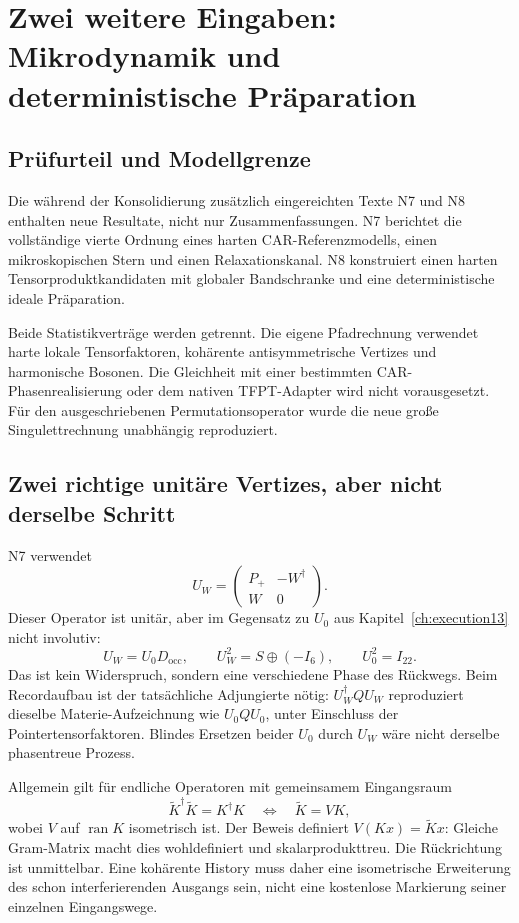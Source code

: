 \chapter{Zwei weitere Eingaben: Mikrodynamik und deterministische Präparation}
\label{ch:newinputs13}
\section{Prüfurteil und Modellgrenze}
Die während der Konsolidierung zusätzlich eingereichten Texte N7 und N8 enthalten neue Resultate, nicht nur Zusammenfassungen. N7 berichtet die vollständige vierte Ordnung eines harten CAR-Referenzmodells, einen mikroskopischen Stern und einen Relaxationskanal. N8 konstruiert einen harten Tensorproduktkandidaten mit globaler Bandschranke und eine deterministische ideale Präparation.

Beide Statistikverträge werden getrennt. Die eigene Pfadrechnung verwendet harte lokale Tensorfaktoren, kohärente antisymmetrische Vertizes und harmonische Bosonen. Die Gleichheit mit einer bestimmten CAR-Phasenrealisierung oder dem nativen TFPT-Adapter wird nicht vorausgesetzt. Für den ausgeschriebenen Permutationsoperator wurde die neue große Singulettrechnung unabhängig reproduziert.

\section{Zwei richtige unitäre Vertizes, aber nicht derselbe Schritt}
N7 verwendet
\begin{equation}
U_W=\begin{pmatrix}P_+&-W^\dagger\\W&0\end{pmatrix}.
\end{equation}
Dieser Operator ist unitär, aber im Gegensatz zu $U_0$ aus Kapitel~\ref{ch:execution13} nicht involutiv:
\begin{equation}
U_W=U_0D_{\mathrm{occ}},\qquad
U_W^2=S\oplus(-I_6),\qquad U_0^2=I_{22}.
\end{equation}
Das ist kein Widerspruch, sondern eine verschiedene Phase des Rückwegs. Beim Recordaufbau ist der tatsächliche Adjungierte nötig:
$U_W^\dagger Q U_W$ reproduziert dieselbe Materie-Aufzeichnung wie $U_0QU_0$, unter Einschluss der Pointertensorfaktoren. Blindes Ersetzen beider $U_0$ durch $U_W$ wäre nicht derselbe phasentreue Prozess.

Allgemein gilt für endliche Operatoren mit gemeinsamem Eingangsraum
\begin{equation}
\widetilde K^\dagger\widetilde K=K^\dagger K
\quad\Longleftrightarrow\quad
\widetilde K=VK,
\end{equation}
wobei $V$ auf $\operatorname{ran}K$ isometrisch ist. Der Beweis definiert $V(Kx)=\widetilde Kx$: Gleiche Gram-Matrix macht dies wohldefiniert und skalarprodukttreu. Die Rückrichtung ist unmittelbar. Eine kohärente History muss daher eine isometrische Erweiterung des schon interferierenden Ausgangs sein, nicht eine kostenlose Markierung seiner einzelnen Eingangswege.

